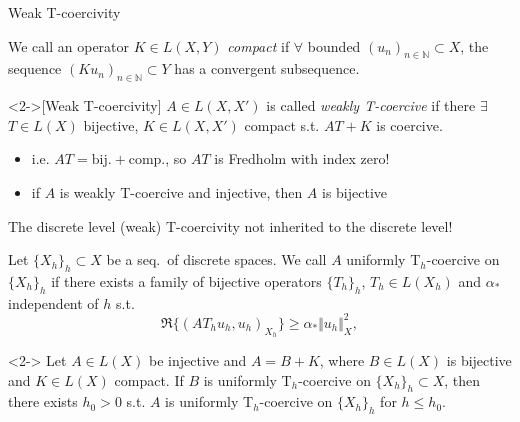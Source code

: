 \documentclass[11pt,aspectratio=169,xcolor=dvipsnames]{beamer}
\newcommand{\N}{\mathbb{N}}
\newcommand{\seq}[1]{(#1_n)_{n \in \N}}
\newcommand{\nicearrow}[2]{\raisebox{#2}{\resizebox{0.45cm}{!}{\color{#1}{\MVRightArrow}\color{black}}}}
\begin{document}
\begin{frame}{Weak T-coercivity}
    \begin{definition}
        We call an operator $K \in L(X,Y)$ \emph{compact} if $\forall$ bounded $\seq{u} \subset X$, the sequence $\seq{K u} \subset Y$ has a convergent subsequence.
    \end{definition}
    \begin{definition}<2->[Weak T-coercivity\footnotemark]
        $A \in L(X,X')$ is called \emph{weakly T-coercive} if there $\exists$ $T \in L(X)$ bijective, $K \in L(X,X')$ compact s.t. $AT + K$ is coercive.   
    \end{definition}
    \begin{itemize}
        \item<3->[\nicearrow{GOE}{-0.06cm}] i.e. $AT = \text{bij.} + \text{comp.}$, so $AT$ is Fredholm with index zero!
        \item<4->[\nicearrow{GOE}{-0.06cm}] if $A$ is weakly T-coercive and injective, then $A$ is bijective
    \end{itemize}
\end{frame}


\begin{frame}{The discrete level}
  \nicearrow{GOE}{-0.07cm} (weak) T-coercivity not inherited to the discrete level!
  \begin{definition}
    Let $\{ X_h \}_{h} \subset X$ be a seq.~of discrete spaces. We call $A$ uniformly T$_h$-coercive on $\{ X_h \}_h$ if there exists a family of bijective operators $\{ T_h \}_h$, $T_h \in L(X_h)$ and  $\alpha_{\ast}$ independent of $h$ s.t. 
    \begin{equation*}
      \Re \{ (A T_hu_h,u_h)_{X_h} \} \ge \alpha_{\ast} \Vert u_h \Vert_{X}^2,
    \end{equation*}
  \end{definition} 
  \begin{theorem}<2->
    Let $A \in L(X)$ be \alert{injective} and $A = B + K$, where $B \in L(X)$ is \alert{bijective} and $K \in L(X)$ \alert{compact}. If \alert{$B$ is uniformly T$_h$-coercive} on $\{X_h\}_h \subset X$, then there exists $h_0 > 0$ s.t. $A$ is uniformly T$_h$-coercive on $\{X_h\}_h$ for $h \le h_0$.
  \end{theorem}
\end{frame}
\end{document}
